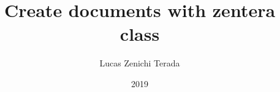 \documentclass[fapesp]{zentera}
\author{Lucas Zenichi Terada}
\title{Create documents with zentera class}
\date{2019}
\begin{document}
\makecover
\makecoversheet
\end{document}
